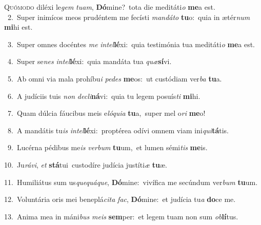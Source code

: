 \lettrine{\initial\textcolor{\initialcolor}{Q}}{uómodo} diléxi le\textit{gem} \textit{tu}\-\textit{am}, \textbf{Dó}\-mine?~\star tota die meditáti\textit{o} \textbf{me}\-a est.\\
{\numbfont\textcolor{\numbcolor}{~2.}}~Super inimícos meos prudéntem me fecísti \textit{man}\-\textit{dá}\textit{to} \textbf{tu}\-o:~\star quia in ætér\textit{num} \textbf{mi}\-hi est.\par
{\numbfont\textcolor{\numbcolor}{~3.}}~Super omnes docéntes \textit{me} \textit{in}\-\textit{tel}\textbf{lé}xi:~\star quia testimónia tua meditáti\textit{o} \textbf{me}\-a est.\par
{\numbfont\textcolor{\numbcolor}{~4.}}~Super se\textit{nes} \textit{in}\-\textit{tel}\textbf{lé}xi:~\star quia mandáta tua \textit{quæ}\-\textbf{sí}vi.\par
{\numbfont\textcolor{\numbcolor}{~5.}}~Ab omni via mala prohíbu\textit{i} \textit{pe}\-\textit{des} \textbf{me}\-os:~\star ut custódiam ver\textit{ba} \textbf{tu}\-a.\par
{\numbfont\textcolor{\numbcolor}{~6.}}~A judíciis tuis \textit{non} \textit{de}\-\textit{cli}\textbf{ná}vi:~\star quia tu legem posuís\textit{ti} \textbf{mi}\-hi.\par
{\numbfont\textcolor{\numbcolor}{~7.}}~Quam dúlcia fáucibus meis e\-\textit{ló}\-\textit{qui}\textit{a} \textbf{tu}\-a,~\star super mel o\textit{ri} \textbf{me}\-o!\par
{\numbfont\textcolor{\numbcolor}{~8.}}~A mandátis tu\textit{is} \textit{in}\-\textit{tel}\textbf{lé}xi:~\star proptérea odívi omnem viam ini\-\textit{qui}\-\textbf{tá}tis.\par
{\numbfont\textcolor{\numbcolor}{~9.}}~Lucérna pédibus me\textit{is} \textit{ver}\-\textit{bum} \textbf{tu}\-um,~\star et lumen sémi\textit{tis} \textbf{me}\-is.\par
{\numbfont\textcolor{\numbcolor}{10.}}~Ju\-\textit{rá}\-\textit{vi}, \textit{et} \textbf{stá}\-tui~\star custodíre judícia justíti\textit{æ} \textbf{tu}\-æ.\par
{\numbfont\textcolor{\numbcolor}{11.}}~Humiliátus sum us\-\textit{que}\-\textit{quá}\textit{que}, \textbf{Dó}\-mine:~\star vivífica me secúndum ver\textit{bum} \textbf{tu}\-um.\par
{\numbfont\textcolor{\numbcolor}{12.}}~Voluntária oris mei beneplá\-\textit{ci}\-\textit{ta} \textit{fac}\-, \textbf{Dó}\-mine:~\star et judícia tu\textit{a} \textbf{do}\-ce me.\par
{\numbfont\textcolor{\numbcolor}{13.}}~Anima mea in máni\textit{bus} \textit{me}\-\textit{is} \textbf{sem}\-per:~\star et legem tuam non sum \textit{ob}\-\textbf{lí}tus.\par
